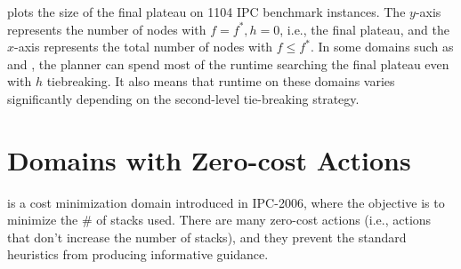 
 plots the size of the final plateau on 1104 IPC
benchmark instances.
The $y$-axis
represents the number of nodes with $f=f^*, h=0$, i.e., the final plateau, and the $x$-axis represents the total
number of nodes with $f\leq f^*$.
In some domains such as  and , the planner can spend most of the runtime
searching the final plateau even with $h$ tiebreaking.
It also
means that runtime on these domains varies significantly depending on the second-level tie-breaking strategy.




\section{Domains with Zero-cost Actions}
\label{sec:zerocost-domains}
  is a cost
minimization domain introduced in IPC-2006, where the objective is to 
minimize the \# of stacks used.
There are many zero-cost actions (i.e., actions that don't increase the number of stacks), and
they prevent the standard heuristics from producing
informative guidance.





